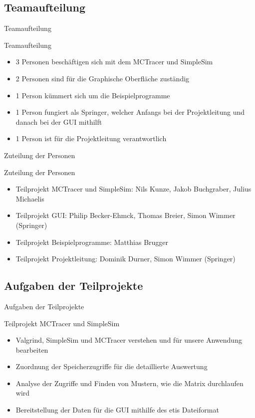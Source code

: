\subsection{Teamaufteilung}
\begin{frame}{Teamaufteilung}
\begin{block}{Teamaufteilung}
\begin{itemize}[<+->]
\pause\item 3 Personen beschäftigen sich mit dem MCTracer und SimpleSim
\item 2 Personen sind für die Graphische Oberfläche zuständig
\item 1 Person kümmert sich um die Beispielprogramme
\item 1 Person fungiert als Springer, welcher Anfangs bei der Projektleitung und danach bei der GUI mithilft
\item 1 Person ist für die Projektleitung verantwortlich
\end{itemize}
\end{block}
\end{frame}

\begin{frame}{Zuteilung der Personen}
\begin{block}{Zuteilung der Personen}
\begin{itemize}[<+->]
\pause\item Teilprojekt MCTracer und SimpleSim: Nils Kunze, Jakob Buchgraber, Julius Michaelis
\item Teilprojekt GUI: Philip Becker-Ehmck, Thomas Breier, Simon Wimmer (Springer)
\item Teilprojekt Beispielprogramme: Matthias Brugger
\item Teilprojekt Projektleitung: Dominik Durner, Simon Wimmer (Springer)
\end{itemize}
\end{block}
\end{frame}

\subsection{Aufgaben der Teilprojekte}

\begin{frame}{Aufgaben der Teilprojekte}
\begin{block}{Teilprojekt MCTracer und SimpleSim}
\begin{itemize}[<+->]
\pause\item Valgrind, SimpleSim und MCTracer verstehen und für unsere Anwendung bearbeiten
\item Zuordnung der Speicherzugriffe für die detaillierte Auswertung
\item Analyse der Zugriffe und Finden von Mustern, wie die Matrix durchlaufen wird
\item Bereitstellung der Daten für die GUI mithilfe des etis Dateiformat
\end{itemize}
\end{block}
\end{frame}

